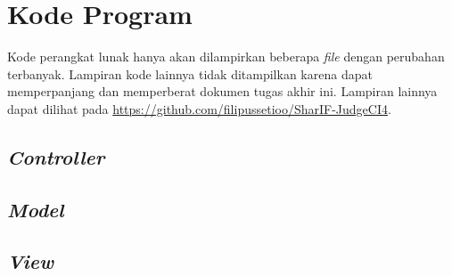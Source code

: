 \chapter{Kode Program}
\label{lamp:A}

%
%
%

Kode perangkat lunak hanya akan dilampirkan beberapa \textit{file} dengan perubahan terbanyak. Lampiran kode lainnya tidak ditampilkan karena dapat memperpanjang dan memperberat dokumen tugas akhir ini. Lampiran lainnya dapat dilihat pada \url{https://github.com/filipussetioo/SharIF-JudgeCI4}.

\section{\textit{Controller}}
\label{sec:lampContr}





\section{\textit{Model}}
\label{sec:lampModel}




\section{\textit{View}}
\label{sec:lampView}







